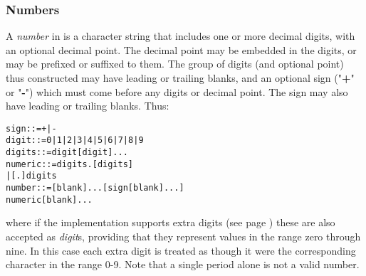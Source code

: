 \subsubsection{Numbers}\label{refdefnum}
 A \emph{number} in \nr{} is a character string that includes one or
more decimal digits, with an optional decimal point.
The decimal point may be embedded in the digits, or may be prefixed or
suffixed to them.
The group of digits (and optional point) thus constructed may have
leading or trailing blanks, and an optional sign ("\textbf{+}"
or "\textbf{-}") which must come before any digits or decimal
point.
The sign may also have leading or trailing blanks.
Thus:
\begin{alltt}
sign    ::=  + | -
digit   ::=  0 | 1 | 2 | 3 | 4 | 5 | 6 | 7 | 8 | 9
digits  ::=  digit [digit]...
numeric ::=  digits . [digits]
             | [.] digits
number  ::=  [blank]... [sign [blank]...]
             numeric [blank]...
\end{alltt}

where if the implementation supports  extra digits (see page \pageref{refsyms}) 
these are also accepted as \emph{digit}s, providing that they
represent values in the range zero through nine.
In this case each extra digit is treated as though it were
the corresponding character in the range 0-9.
 Note that a single period alone is not a valid number.
